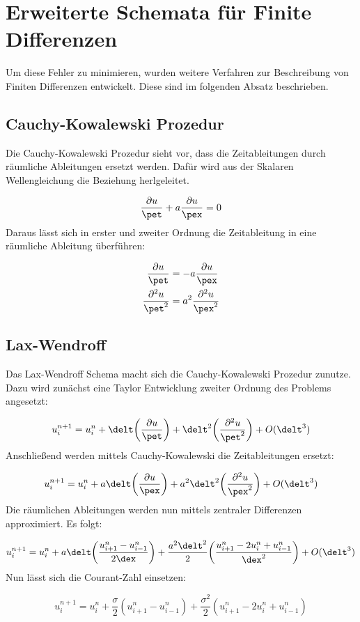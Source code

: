 \section{Erweiterte Schemata f\"ur Finite Differenzen}
Um diese Fehler zu minimieren, wurden weitere Verfahren zur Beschreibung von Finiten Differenzen entwickelt. Diese sind im folgenden Absatz beschrieben.

\subsection{Cauchy-Kowalewski Prozedur}
Die Cauchy-Kowalewski Prozedur sieht vor, dass die Zeitableitungen durch r\"aumliche Ableitungen ersetzt werden. Daf\"ur wird aus der Skalaren Wellengleichung die Beziehung herlgeleitet.
\par
\begin{equation*}
	\frac{\partial u}{\pet} + a \frac{\partial u}{\pex} = 0
\end{equation*}
Daraus l\"asst sich in erster und zweiter Ordnung die Zeitableitung in eine r\"aumliche Ableitung \"uberf\"uhren:
\par
\begin{align*}
	\frac{\partial u}{\pet} &= -a \frac{\partial u}{\pex} \\
	\frac{\partial^2 u}{\pet^2} &= a^2\frac{\partial^2 u}{\pex^2}
\end{align*}

\subsection{Lax-Wendroff}
Das Lax-Wendroff Schema macht sich die Cauchy-Kowalewski Prozedur zunutze. Dazu wird zun\"achst eine Taylor Entwicklung zweiter Ordnung des Problems angesetzt:
\par
\begin{equation*}
	u_i^{n+1} = u_i^n + \delt\bigg(\frac{\partial u}{\pet}\bigg) + \delt^2\bigg(\frac{\partial^2 u}{\pet^2}\bigg) + O(\delt^3)
\end{equation*}
Anschlie\ss{}end werden mittels Cauchy-Kowalewski die Zeitableitungen ersetzt:
\par
\begin{equation*}
	u_i^{n+1} = u_i^n + a\delt\bigg(\frac{\partial u}{\pex}\bigg) + a^2\delt^2\bigg(\frac{\partial^2 u}{\pex^2}\bigg) + O(\delt^3)
\end{equation*}
Die r\"aumlichen Ableitungen werden nun mittels zentraler Differenzen approximiert. Es folgt:
\par
\begin{equation*}
	u_i^{n+1} = u_i^n + a\delt\bigg(\frac{u^n_{i+1} - u^n_{i-1}}{2\dex}\bigg) + \frac{a^2\delt^2}{2}\bigg(\frac{u^n_{i+1} - 2u^n_i + u^n_{i-1}}{\dex^2}\bigg) + O(\delt^3)
\end{equation*}
Nun l\"asst sich die Courant-Zahl einsetzen:
\par
\begin{equation*}
	u_i^{n+1} = u_i^n + \frac{\sigma}{2}(u^n_{i+1} - u^n_{i-1}) + \frac{\sigma^2}{2}(u^n_{i+1} - 2u^n_i + u^n_{i-1})
\end{equation*}

